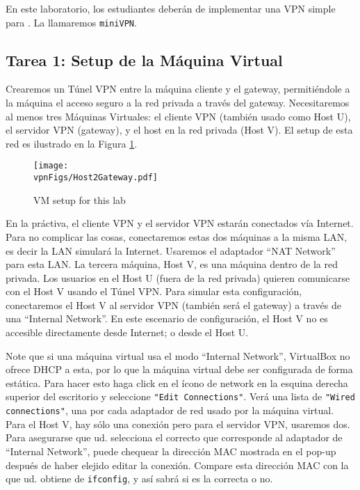 En este laboratorio, los estudiantes deberán de implementar una VPN simple para \linux. La llamaremos {\tt miniVPN}. 


\subsection{Tarea 1: Setup de la Máquina Virtual}

Crearemos un Túnel VPN entre la máquina cliente y el gateway, permitiéndole a la máquina el acceso seguro a la red privada a través del gateway.
Necesitaremos al menos tres Máquinas Virtuales: el cliente VPN (también usado como Host U), el servidor VPN (gateway), y el host en la red privada (Host V).
El setup de esta red es ilustrado en la Figura \ref{vpn:fig:host2gateway}.

\begin{figure}[htb]
\begin{center}
\texttt{[image: \\vpnFigs/Host2Gateway.pdf]}
\end{center}
\caption{VM setup for this lab}
\label{vpn:fig:host2gateway}
\end{figure}
 

En la práctiva, el cliente VPN y el servidor VPN estarán conectados vía Internet.
Para no complicar las cosas, conectaremos estas dos máquinas a la misma LAN, es decir la LAN simulará la Internet.
Usaremos el adaptador ``NAT Network'' para esta LAN.
La tercera máquina, Host V, es una máquina dentro de la red privada. Los usuarios en el Host U (fuera de la red privada) quieren comunicarse con el Host V usando el Túnel VPN. Para simular esta configuración, conectaremos el Host V al servidor VPN (también será el gateway) a través de una  ``Internal Network''. En este escenario de configuración, el Host V no es accesible directamente desde Internet; o desde el Host U.

Note que si una máquina virtual usa el modo ``Internal Network'', VirtualBox no ofrece DHCP a esta, por lo que la máquina virtual debe ser configurada de forma estática. Para hacer esto haga click en el ícono de network en la esquina derecha superior del escritorio y seleccione \texttt{"Edit Connections"}. Verá una lista de \texttt{"Wired connections"}, una por cada adaptador de red usado por la máquina virtual.
Para el Host V, hay sólo una conexión pero para el servidor VPN, usaremos dos. Para asegurarse que ud. selecciona el correcto que corresponde al adaptador de ``Internal Network'', puede chequear la dirección MAC mostrada en el pop-up después de haber elejido editar la conexión.
Compare esta dirección MAC con la que ud. obtiene de  \texttt{ifconfig}, y así sabrá si es la correcta o no.

